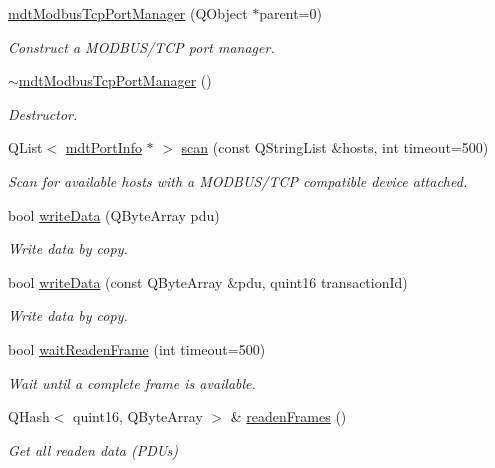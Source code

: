 \begin{DoxyCompactItemize}
\item 
\hyperlink{classmdt_modbus_tcp_port_manager_a2f65f779bbad19d9d3f85ef35220ffb8}{mdtModbusTcpPortManager} (QObject $\ast$parent=0)
\begin{DoxyCompactList}\small\item\em Construct a MODBUS/TCP port manager. \end{DoxyCompactList}\item 
\hyperlink{classmdt_modbus_tcp_port_manager_aabe51a50a53c6b23884cc4862730b731}{$\sim$mdtModbusTcpPortManager} ()
\begin{DoxyCompactList}\small\item\em Destructor. \end{DoxyCompactList}\item 
QList$<$ \hyperlink{classmdt_port_info}{mdtPortInfo} $\ast$ $>$ \hyperlink{classmdt_modbus_tcp_port_manager_a216ee2495440be4eefb2faf9da3c9e47}{scan} (const QStringList \&hosts, int timeout=500)
\begin{DoxyCompactList}\small\item\em Scan for available hosts with a MODBUS/TCP compatible device attached. \end{DoxyCompactList}\item 
bool \hyperlink{classmdt_modbus_tcp_port_manager_addd9b9336417aa964eea91ca2f95d26e}{writeData} (QByteArray pdu)
\begin{DoxyCompactList}\small\item\em Write data by copy. \end{DoxyCompactList}\item 
bool \hyperlink{classmdt_modbus_tcp_port_manager_a043a1cb15b045037f97eebd4ffe6cef8}{writeData} (const QByteArray \&pdu, quint16 transactionId)
\begin{DoxyCompactList}\small\item\em Write data by copy. \end{DoxyCompactList}\item 
bool \hyperlink{classmdt_modbus_tcp_port_manager_a233d2acf67dca192fb36ce407d90bfb7}{waitReadenFrame} (int timeout=500)
\begin{DoxyCompactList}\small\item\em Wait until a complete frame is available. \end{DoxyCompactList}\item 
QHash$<$ quint16, QByteArray $>$ \& \hyperlink{classmdt_modbus_tcp_port_manager_a6dd3c77348286dfd323ae8a1becad33c}{readenFrames} ()
\begin{DoxyCompactList}\small\item\em Get all readen data (PDUs) \end{DoxyCompactList}\end{DoxyCompactItemize}


